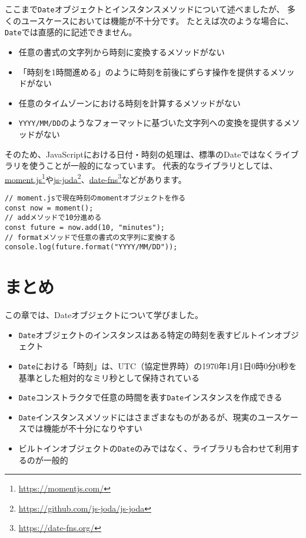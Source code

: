 ここまで\texttt{Date}オブジェクトとインスタンスメソッドについて述べましたが、
多くのユースケースにおいては機能が不十分です。
たとえば次のような場合に、\texttt{Date}では直感的に記述できません。

\begin{itemize}
\item
  任意の書式の文字列から時刻に変換するメソッドがない
\item
  「時刻を1時間進める」のように時刻を前後にずらす操作を提供するメソッドがない
\item
  任意のタイムゾーンにおける時刻を計算するメソッドがない
\item
  \texttt{YYYY/MM/DD}のようなフォーマットに基づいた文字列への変換を提供するメソッドがない
\end{itemize}

そのため、JavaScriptにおける日付・時刻の処理は、標準のDateではなくライブラリを使うことが一般的になっています。
代表的なライブラリとしては、\href{https://momentjs.com/}{moment.js}\footnote{\url{https://momentjs.com/}}や\href{https://github.com/js-joda/js-joda}{js-joda}\footnote{\url{https://github.com/js-joda/js-joda}}、\href{https://date-fns.org/}{date-fns}\footnote{\url{https://date-fns.org/}}などがあります。

\begin{lstlisting}
// moment.jsで現在時刻のmomentオブジェクトを作る
const now = moment();
// addメソッドで10分進める
const future = now.add(10, "minutes");
// formatメソッドで任意の書式の文字列に変換する
console.log(future.format("YYYY/MM/DD")); 
\end{lstlisting}

\hypertarget{conclusion}{%
\section{まとめ}\label{conclusion}}

この章では、Dateオブジェクトについて学びました。

\begin{itemize}
\item
  \texttt{Date}オブジェクトのインスタンスはある特定の時刻を表すビルトインオブジェクト
\item
  \texttt{Date}における「時刻」は、UTC（協定世界時）の1970年1月1日0時0分0秒を基準とした相対的なミリ秒として保持されている
\item
  \texttt{Date}コンストラクタで任意の時間を表す\texttt{Date}インスタンスを作成できる
\item
  \texttt{Date}インスタンスメソッドにはさまざまなものがあるが、現実のユースケースでは機能が不十分になりやすい
\item
  ビルトインオブジェクトの\texttt{Date}のみではなく、ライブラリも合わせて利用するのが一般的
\end{itemize}
